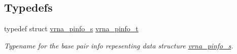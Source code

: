 \subsection*{Typedefs}
\begin{DoxyCompactItemize}
\item 
\mbox{\label{group__aln__utils_ga6660dfca23debee7306e0cd53341263f}} 
typedef struct \hyperlink{group__aln__utils_structvrna__pinfo__s}{vrna\+\_\+pinfo\+\_\+s} \hyperlink{group__aln__utils_ga6660dfca23debee7306e0cd53341263f}{vrna\+\_\+pinfo\+\_\+t}
\begin{DoxyCompactList}\small\item\em Typename for the base pair info repesenting data structure \hyperlink{group__aln__utils_structvrna__pinfo__s}{vrna\+\_\+pinfo\+\_\+s}. \end{DoxyCompactList}\end{DoxyCompactItemize}
